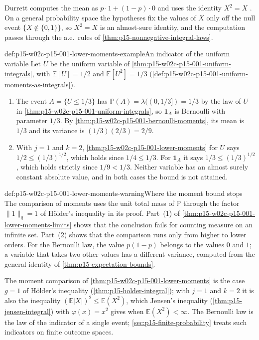 Durrett computes the mean as \(p\cdot1+(1-p)\cdot0\) and uses the identity
\(X^2=X\) \cite[example~1.6.12, p.~34]{DurrettPTEAuthor2019}. On a
general probability space the hypotheses fix the values of \(X\) only off
the null event \(\{X\notin\{0,1\}\}\), so \(X^2=X\) is an almost-sure
identity, and the computation passes through the a.e.\ rules of
\cref{thm:p15-nonnegative-integral-laws}.

\begin{hbexample}{def:p15-w02c-p15-001-lower-moments-example}{An indicator of the uniform variable}
Let \(U\) be the uniform variable of
\cref{thm:p15-w02c-p15-001-uniform-integrals}, with
\(\mathbb E[U]=1/2\) and \(\mathbb E[U^2]=1/3\)
(\cref{def:p15-w02c-p15-001-uniform-moments-as-integrals}).
\begin{enumerate}
\item The event \(A=\{U\leq1/3\}\) has
      \(\mathbb P(A)=\lambda((0,1/3])=1/3\) by the law of \(U\) in
      \cref{thm:p15-w02c-p15-001-uniform-integrals}, so \(\mathbf1_A\) is
      Bernoulli with parameter \(1/3\). By
      \cref{thm:p15-w02c-p15-001-bernoulli-moments}, its mean is \(1/3\)
      and its variance is \((1/3)(2/3)=2/9\).
\item With \(j=1\) and \(k=2\),
      \cref{thm:p15-w02c-p15-001-lower-moments} for \(U\) says
      \(1/2\leq(1/3)^{1/2}\), which holds since \(1/4\leq1/3\). For
      \(\mathbf1_A\) it says \(1/3\leq(1/3)^{1/2}\), which holds strictly
      since \(1/9<1/3\). Neither variable has an almost surely constant
      absolute value, and in both cases the bound is not attained.
\end{enumerate}
\end{hbexample}

\begin{hbwarning}{def:p15-w02c-p15-001-lower-moments-warning}{Where the moment bound stops}
The comparison of moments uses the unit total mass of \(\mathbb P\)
through the factor \(\|1\|_q=1\) of H\"older's inequality in its proof.
Part~(1) of \cref{thm:p15-w02c-p15-001-lower-moments-limits} shows that
the conclusion fails for counting measure on an infinite set. Part~(2)
shows that the comparison runs only from higher to lower orders. For the
Bernoulli law, the value \(p(1-p)\) belongs to the values \(0\) and \(1\);
a variable that takes two other values has a different variance, computed
from the general identity of \cref{thm:p15-expectation-bounds}.
\end{hbwarning}

The moment comparison of \cref{thm:p15-w02c-p15-001-lower-moments} is the
case \(g=1\) of H\"older's inequality (\cref{thm:p15-holder-integral});
with \(j=1\) and \(k=2\) it is also the inequality
\((\mathbb E|X|)^2\leq\mathbb E(X^2)\), which Jensen's inequality
(\cref{thm:p15-jensen-integral}) with \(\varphi(x)=x^2\) gives when
\(\mathbb E(X^2)<\infty\). The Bernoulli law is the law of the indicator of a
single event; \cref{sec:p15-finite-probability} treats such indicators on
finite outcome spaces.

